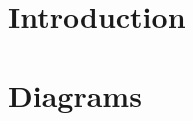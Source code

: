 \documentclass[11pt,a5paper,footinclude=true,headinclude=true]{report} %
\begin{document}

	\tableofcontents 
	
\part{Introduction}
  
\part{Diagrams}

\end{document}
